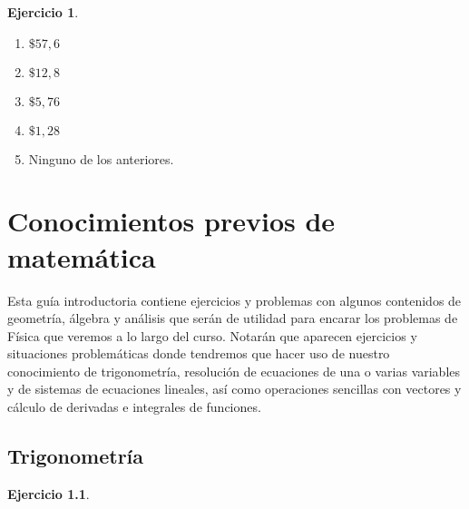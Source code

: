 \documentclass[a4paper,12pt,twoside]{book}
\newtheorem{ejercicio}{{Ejercicio}}[chapter]
\begin{document}
\begin{mdframed}[style=ejercicio-facil]
    \begin{ejercicio}
    \end{ejercicio}
    \begin{enumerate}
        \item $\$ 57,6$
        \item $\$ 12,8$
        \item $\$ 5,76$
        \item $\$ 1,28$
        \item Ninguno de los anteriores.
    \end{enumerate}
\end{mdframed}

\appendix


\chapter{Conocimientos previos de matemática}

Esta guía introductoria contiene ejercicios y problemas con algunos contenidos de geometría, álgebra y análisis que serán de utilidad para encarar los problemas de Física que veremos a lo largo del curso.
Notarán que aparecen ejercicios y situaciones problemáticas donde tendremos que hacer uso de nuestro conocimiento de trigonometría, resolución de ecuaciones de una o varias variables y de sistemas de ecuaciones lineales, así como operaciones sencillas con vectores y cálculo de derivadas e integrales de funciones.


\section{Trigonometría}

\begin{mdframed}[style=ejercicio-facil]
    \begin{ejercicio}
    \end{ejercicio}
    \begin{center}
        \def\svgwidth{0.5\linewidth}
        
    \end{center}
\end{mdframed}
\end{document}
